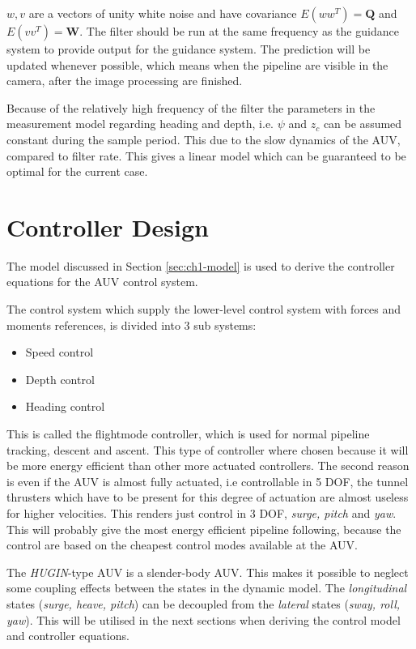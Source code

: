 	$w, v$ are a vectors of unity white noise and have covariance $E(ww^T) = \mathbf{Q}$ and $E(vv^T) =
	\mathbf{W}$. The filter should be run at the same frequency as the guidance system to provide output
	for the guidance system. The prediction will be updated whenever possible, which means when the
	pipeline are visible in the camera, after the image processing are finished.

	Because of the relatively high frequency of the filter the parameters in the measurement model
	regarding heading and depth, i.e. $\psi$ and $z_c$ can be assumed constant during the sample period.
	This due to the slow dynamics of the AUV, compared to filter rate. This gives a linear model which can
	be guaranteed to be optimal for the current case.


\section{Controller Design}
	The model discussed in Section \ref{sec:ch1-model} is used to derive the controller equations for the
	AUV control system.

	The control system which supply the lower-level control system with forces and moments references, is 
	divided into 3 sub systems:
		\begin{itemize}
			\item Speed control
			\item Depth control
			\item Heading control
		\end{itemize}
	This is called the flightmode controller, which is used for normal pipeline tracking, descent and
	ascent. This type of controller where chosen because it will be more energy efficient than other more
	actuated controllers. The second reason is even if the AUV is almost fully actuated, i.e
	controllable in 5 DOF, the tunnel thrusters which have to be present for this degree of actuation are almost
	useless for higher velocities. This renders just control in 3 DOF, \textit{surge, pitch} and
	\textit{yaw}. This will probably give the most energy efficient pipeline following, because the
	control are based on the cheapest control modes available at the AUV.
	
	The \textit{HUGIN}-type AUV is a slender-body AUV. This makes it possible to neglect some
	coupling effects between the states in the dynamic model. The \textit{longitudinal} states 
	(\textit{surge, heave, pitch}) can be decoupled from the \textit{lateral} states 
	(\textit{sway, roll, yaw}). This will be utilised in the next sections when deriving the control model
	and controller equations.

